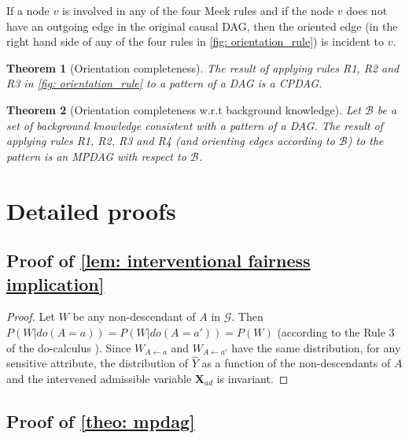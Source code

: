 \documentclass{article} %
\newtheorem{theorem}{Theorem}[section]
\begin{document}
\begin{Properties}
  \item \citep[Property 1]{katz2019size}\label{property} If a node $v$ is involved in any of the four Meek rules and if the node $v$ does not have an outgoing edge in the original causal DAG, then the oriented edge (in the right hand side of any of the four rules in \cref{fig: orientation_rule}) is incident to $v$.
\end{Properties}

\begin{theorem}[Orientation completeness]\citep[Theorem 3]{meek1995causal} \label{theo: orientation completeness}
    The result of applying rules R1, R2 and R3 in \cref{fig: orientation_rule} to a pattern of a DAG is a CPDAG.
\end{theorem}

\begin{theorem}[Orientation completeness w.r.t background knowledge]\citep[Theorem 4]{meek1995causal} \label{theo: orientation completeness with bk}
    Let $\mathcal{B}$ be a set of background knowledge consistent with a pattern of a DAG. The result of applying rules R1, R2, R3 and R4 (and orienting edges according to $\mathcal{B}$) to the pattern is an MPDAG with respect to $\mathcal{B}$.
\end{theorem}%
\section{Detailed proofs}

\subsection{Proof of \cref{lem: interventional fairness implication}} \label{proof_lem: interventional fairness implication}
\begin{proof}
    Let $W$ be any non-descendant of $A$ in $\mathcal{G}$. Then $P(W|do(A=a))=P(W|do(A=a'))=P(W)$ (according to the Rule 3 of the do-calculus \citep{pearl2009causality}). Since $W_{A \leftarrow a}$ and $W_{A \leftarrow a'}$ have the same distribution, for any sensitive attribute, the distribution of $\hat{Y}$ as a function of the non-descendants of $A$ and the intervened admissible variable $\mathbf{X}_{ad}$ is invariant.
\end{proof}
  
\subsection{Proof of \cref{theo: mpdag}} \label{Appendix: proof_theo: mpdag} 
\end{document}
